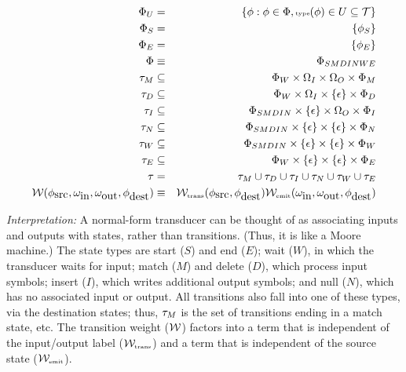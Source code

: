 \documentclass{beamer}
\begin{document}
\begin{frame}

\small
\begin{eqnarray*}
\Phi_U & = & \{ \phi: \phi\in\Phi, \mbox{\tiny type}(\phi) \in U \subseteq {\cal T} \} \\
\Phi_{S} & = & \{ \phi_S \} \\
\Phi_{E} & = & \{ \phi_E \} \\
\Phi & \equiv & \Phi_{SMDINWE} \\   
\tau_M & \subseteq & \Phi_{W} \times \Omega_I \times \Omega_O \times \Phi_{M} \\
\tau_D & \subseteq & \Phi_{W} \times \Omega_I \times \{\epsilon\} \times \Phi_{D} \\
\tau_I & \subseteq & \Phi_{SMDIN} \times \{\epsilon\} \times \Omega_O \times \Phi_{I} \\
\tau_N & \subseteq & \Phi_{SMDIN} \times \{\epsilon\} \times \{\epsilon\} \times \Phi_{N} \\
\tau_W & \subseteq & \Phi_{SMDIN} \times \{\epsilon\} \times \{\epsilon\} \times \Phi_{W} \\
\tau_E & \subseteq & \Phi_{W} \times \{\epsilon\} \times \{\epsilon\} \times \Phi_{E} \\
\tau & = & \tau_M \cup \tau_D \cup \tau_I \cup \tau_N \cup \tau_W \cup \tau_E \\
{\cal W}(\phi_{\mbox{src}},\omega_{\mbox{in}},\omega_{\mbox{out}},\phi_{\mbox{dest}}) & \equiv & {\cal W}_{\mbox{\tiny trans}}(\phi_{\mbox{src}},\phi_{\mbox{dest}}) {\cal W}_{\mbox{\tiny emit}}(\omega_{\mbox{in}},\omega_{\mbox{out}},\phi_{\mbox{dest}})
\end{eqnarray*}
\normalsize

\end{frame}

\begin{frame}{}

{\em Interpretation:}
A normal-form transducer can be thought of as associating inputs and outputs with states, rather than transitions.
(Thus, it is like a Moore machine.)
The state types are
 start ($S$) and end ($E$);
 wait ($W$), in which the transducer waits for input;
 match ($M$) and delete ($D$), which process input symbols;
 insert ($I$), which writes additional output symbols; and
 null ($N$), which has no associated input or output.
All transitions also fall into one of these types, via the destination states;
thus, $\tau_M$ is the set of transitions ending in a match state, etc.
The transition weight (${\cal W}$) factors into a term that is independent of the input/output label (${\cal W}_{\mbox{\tiny trans}}$)
and a term that is independent of the source state (${\cal W}_{\mbox{\tiny emit}}$).

\end{frame}
\end{document}
